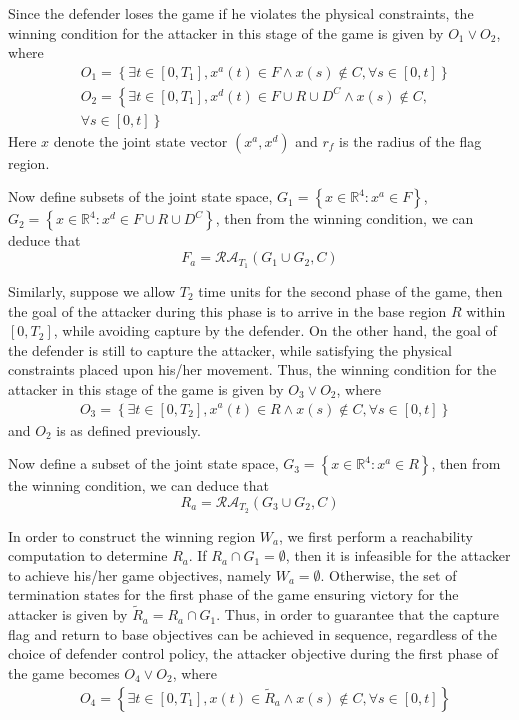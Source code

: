 Since the defender loses the game if he violates the physical constraints, the 
winning condition for the attacker in this stage of the game is given by
$O_1 \vee O_2$, where
\begin{align*}
&O_1 = \left\{\exists t \in [0,T_1], x^a(t) \in F \wedge x(s) \notin C, \forall s \in [0,t]\right\} \\ 
&O_2 = \left\{\exists t \in [0,T_1], x^d(t) \in F \cup R \cup D^C \wedge x(s) \notin C, \right. \\
&\left.  \forall s \in [0,t]\right\}
\end{align*}
Here $x$ denote the joint state vector $(x^a, x^d)$ and $r_f$ is the radius of the flag region.

Now define subsets of the joint state space, $G_1 = \left\{x \in \mathbb{R}^4: x^a \in F \right\}$, 
$G_2 = \left\{x \in \mathbb{R}^4: x^d \in F \cup R \cup D^C \right\}$,
then from the winning condition, we can deduce that 
\begin{equation}
F_a = \mathcal{RA}_{T_1}(G_1 \cup G_2, C)
\end{equation}

Similarly, suppose we allow $T_2$ time units for the second phase of the game,
then the goal of the attacker during this phase is to arrive in 
the base region $R$ within $[0,T_2]$, while avoiding capture by the defender.  
On the other hand, the goal of the defender is still to capture the attacker, 
while satisfying the physical constraints placed upon his/her movement.  Thus, the 
winning condition for the attacker in this stage of the game is given by
$O_3 \vee O_2$, where
\begin{align*}
&O_3 = \left\{\exists t \in [0,T_2], x^a(t) \in R \wedge x(s) \notin C, \forall s \in [0,t]\right\}
\end{align*}
and $O_2$ is as defined previously.

Now define a subset of the joint state space, $G_3 = \left\{x \in \mathbb{R}^4: x^a \in R \right\}$, 
then from the winning condition, we can deduce that 
\begin{equation}
R_a = \mathcal{RA}_{T_2}(G_3 \cup G_2, C)
\end{equation}

In order to construct the winning region $W_a$, we first perform
a reachability computation to determine $R_a$.  
If $R_a \cap G_1 = \emptyset$, then it is infeasible for the attacker
to achieve his/her game objectives, namely $W_a = \emptyset$.  Otherwise,
the set of termination states for the first phase of the 
game ensuring victory for the attacker
is given by $\tilde{R}_a = R_a \cap G_1$.  Thus, in order to guarantee
that the capture flag and return to base objectives can be achieved in
sequence, regardless of the choice of defender control policy,
the attacker objective during the first phase of the game becomes
$O_4 \vee O_2$, where
\begin{align*}
&O_4 = \left\{\exists t \in [0,T_1], x(t) \in \tilde{R}_a \wedge x(s) \notin C, \forall s \in [0,t]\right\}
\end{align*}

